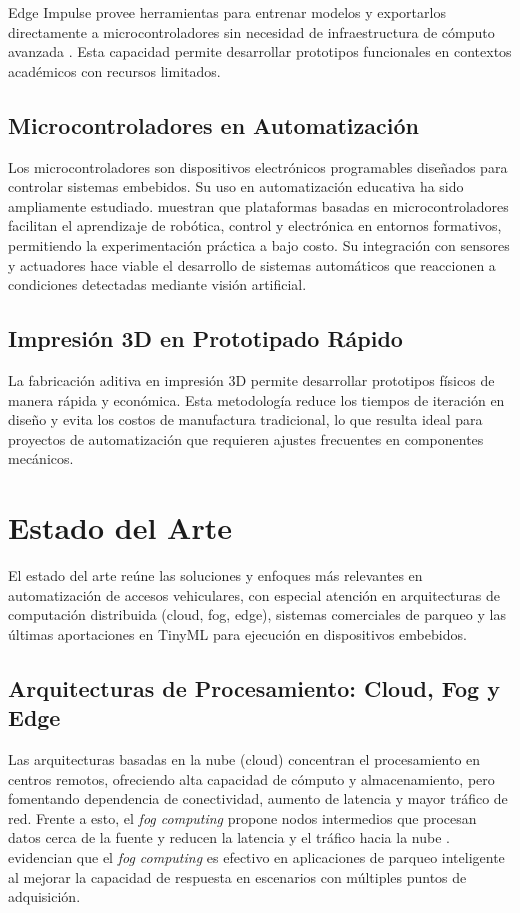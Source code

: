 \documentclass[12pt, letterpaper]{article}
\begin{document}
Edge Impulse provee herramientas para entrenar modelos y exportarlos directamente a microcontroladores sin necesidad de infraestructura de cómputo avanzada \parencite{edgeimpulseDocs}. Esta capacidad permite desarrollar prototipos funcionales en contextos académicos con recursos limitados.

\subsection{Microcontroladores en Automatización}
Los microcontroladores son dispositivos electrónicos programables diseñados para controlar sistemas embebidos. Su uso en automatización educativa ha sido ampliamente estudiado. \textcite{candelas2015arduino} muestran que plataformas basadas en microcontroladores facilitan el aprendizaje de robótica, control y electrónica en entornos formativos, permitiendo la experimentación práctica a bajo costo. Su integración con sensores y actuadores hace viable el desarrollo de sistemas automáticos que reaccionen a condiciones detectadas mediante visión artificial.

\subsection{Impresión 3D en Prototipado Rápido}
La fabricación aditiva en impresión 3D permite desarrollar prototipos físicos de manera rápida y económica. Esta metodología reduce los tiempos de iteración en diseño y evita los costos de manufactura tradicional, lo que resulta ideal para proyectos de automatización que requieren ajustes frecuentes en componentes mecánicos.

\section{Estado del Arte}
El estado del arte reúne las soluciones y enfoques más relevantes en automatización de accesos vehiculares, con especial atención en arquitecturas de computación distribuida (cloud, fog, edge), sistemas comerciales de parqueo y las últimas aportaciones en TinyML para ejecución en dispositivos embebidos.

\subsection{Arquitecturas de Procesamiento: Cloud, Fog y Edge}
Las arquitecturas basadas en la nube (cloud) concentran el procesamiento en centros remotos, ofreciendo alta capacidad de cómputo y almacenamiento, pero fomentando dependencia de conectividad, aumento de latencia y mayor tráfico de red. Frente a esto, el \textit{fog computing} propone nodos intermedios que procesan datos cerca de la fuente y reducen la latencia y el tráfico hacia la nube \parencite{bonomi2012fog, celaya2020fog}. \textcite{celaya2020fog} evidencian que el \textit{fog computing} es efectivo en aplicaciones de parqueo inteligente al mejorar la capacidad de respuesta en escenarios con múltiples puntos de adquisición.
\end{document}

